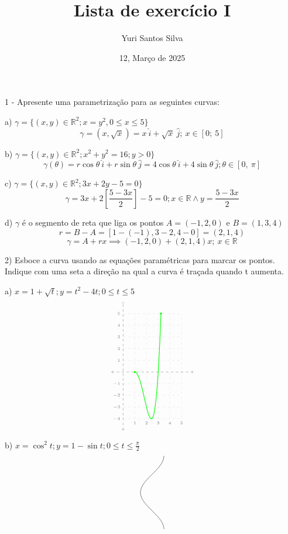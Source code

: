 \documentclass[12pt,a4paper]{article}
\author{Yuri Santos Silva}
\date{12, Março de 2025}
\title{Lista de exercício I}
\begin{document}
\maketitle
\vspace*{.5cm}

1 - Apresente uma parametrização para as seguintes curvas:

a) \( \gamma = \{ (x,y) \in \mathbb{R}^2; x = y^2, 0 \leq x \leq 5 \} \)
\[
  \gamma = (x,\sqrt{x}) = x\ \hat{i} + \sqrt{x}\ \hat{j};\ x \in [0;\ 5]
\]

b) \( \gamma = \{ (x,y) \in \mathbb{R}^2; x^2 + y^2 = 16; y > 0 \} \)
\[
  \gamma(\theta) = r\cos \theta\ \hat{i} + r\sin \theta\ \hat{j} = 4 \cos \theta\ \hat{i} + 4 \sin \theta\ \hat{j}; \theta \in [0,\ \pi]
\]

c) \( \gamma = \{ (x,y) \in \mathbb{R}^2; 3x + 2y - 5 = 0 \} \)
\[
  \gamma = 3x + 2\left[ \frac{5-3x}{2} \right] - 5 = 0; x \in \mathbb{R} \land y = \frac{5-3x}{2}
\]

d) \( \gamma \) é o segmento de reta que liga os pontos \( A = (-1,2,0) \) e \( B = (1,3,4) \)
\[
  r = B - A = [1 - (-1), 3 - 2, 4 - 0] = (2, 1, 4)
\]
\[
  \gamma = A + rx \implies (-1,2,0) + (2,1,4)x;\ x \in \mathbb{R}
\]
  
2) Esboce a curva usando as equações paramétricas para marcar os pontos. Indique com uma seta a direção na qual a curva é traçada quando t aumenta.

a) \( x = 1 + \sqrt{t}; y = t^2 - 4t; 0 \leq t \leq 5 \)
\[
  \begin{tikzpicture}[domain=0:5,smooth,samples=500,scale=.5]
    \draw[dashed,gray,<->] (0,-5) -- (0,6);
    \draw[dashed,gray,<->] (-1,0) -- (6,0);
    
    \foreach \x in {1,2,...,5}
    \draw[dashed,gray,opacity=.2] (\x,-4) -- (\x,5) node[anchor=north,pos=0,opacity=1]{\tiny$\x$};
    \foreach \x in {-4,...,-1,1,2,...,5}
    \draw[dashed,gray,opacity=.2] (0,\x) -- (5,\x) node[pos=0,anchor=east,opacity=1]{\tiny$\x$};

    \draw[green,thick] plot({1 + sqrt(\x)}, {\x * \x - 4 * \x});
    \draw[fill,green] (1,0) circle (2pt);
    \draw[fill,green] (3.24,5) circle (2pt);
  \end{tikzpicture}
\]

b) \( x = \cos^2 t; y =  1 - \sin t; 0\leq t \leq \frac{\pi}{2} \)
\[
  \begin{tikzpicture}[domain=0:3.14,samples=500,smooth]
    \draw plot ({(cos(\x r))^2},{1 - sin (\x) r});
  \end{tikzpicture}
\]
\end{document}
